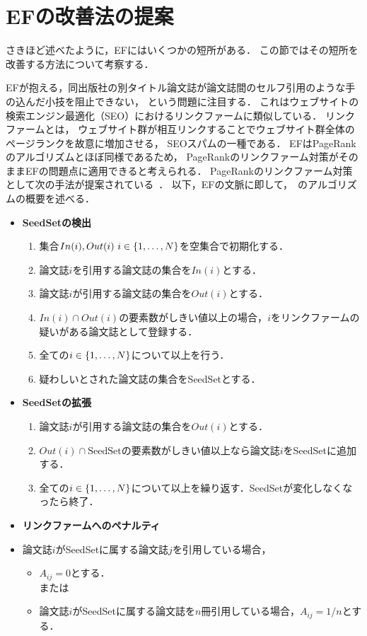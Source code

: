 \section{EFの改善法の提案}
さきほど述べたように，EFにはいくつかの短所がある．
この節ではその短所を改善する方法について考察する．
\par
EFが抱える，同出版社の別タイトル論文誌が論文誌間のセルフ引用のような手の込んだ小技を阻止できない，
という問題に注目する．
これはウェブサイトの検索エンジン最適化（SEO）におけるリンクファームに類似している．
リンクファームとは，
ウェブサイト群が相互リンクすることでウェブサイト群全体のページランクを故意に増加させる，
SEOスパムの一種である．
EFはPageRankのアルゴリズムとほぼ同様であるため，
PageRankのリンクファーム対策がそのままEFの問題点に適用できると考えられる．
PageRankのリンクファーム対策として次の手法が提案されている~\cite{wu2005}．
以下，EFの文脈に即して，~\cite{wu2005}のアルゴリズムの概要を述べる．
\begin{itemize}
    \item \textbf{SeedSetの検出}
    \begin{enumerate}
        \item 集合$In(i), Out(i)~i \in \lbrace 1,\ldots,N \rbrace$を空集合で初期化する．
        \item 論文誌$i$を引用する論文誌の集合を$In(i)$とする．
        \item 論文誌$i$が引用する論文誌の集合を$Out(i)$とする．
        \item $In(i) \cap Out(i)$の要素数がしきい値以上の場合，$i$をリンクファームの疑いがある論文誌として登録する．
        \item 全ての$i \in \lbrace 1,\ldots,N \rbrace$について以上を行う．
        \item 疑わしいとされた論文誌の集合をSeedSetとする．
    \end{enumerate}
    \item \textbf{SeedSetの拡張}
    \begin{enumerate}
        \item 論文誌$i$が引用する論文誌の集合を$Out(i)$とする．
        \item $Out(i) \cap \text{SeedSet}$の要素数がしきい値以上なら論文誌$i$をSeedSetに追加する．
        \item 全ての$i \in \lbrace 1,\ldots,N \rbrace$について以上を繰り返す．SeedSetが変化しなくなったら終了．
    \end{enumerate}
    \item \textbf{リンクファームへのペナルティ} 
    \item[] 論文誌$i$がSeedSetに属する論文誌$j$を引用している場合，
    \begin{itemize}
        \item $A_{ij}=0$とする． \\または
        \item 論文誌$i$がSeedSetに属する論文誌を$n$冊引用している場合，$A_{ij}=1/n$とする．
    \end{itemize}
\end{itemize}
